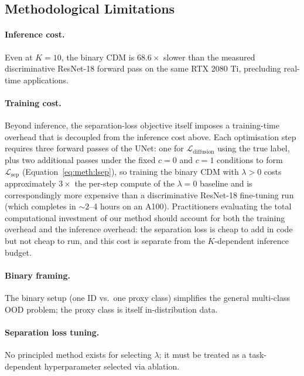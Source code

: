\subsection{Methodological Limitations}
\label{sec:disc:limitations:methodological}

\paragraph{Inference cost.}
Even at $K{=}10$, the binary CDM is $68.6{\times}$ slower than the
measured discriminative ResNet-18 forward pass on the same RTX 2080 Ti,
precluding real-time applications.

\paragraph{Training cost.}
Beyond inference, the separation-loss objective itself imposes a
training-time overhead that is decoupled from the inference cost above.
Each optimisation step requires three forward passes of the UNet: one
for $\mathcal{L}_{\text{diffusion}}$ using the true label, plus two
additional passes under the fixed $c{=}0$ and $c{=}1$ conditions to form
$\mathcal{L}_{\text{sep}}$
(Equation~\ref{eq:meth:lsep}), so
training the binary CDM with $\lambda > 0$ costs approximately
$3{\times}$ the per-step compute of the $\lambda = 0$ baseline and is
correspondingly more expensive than a discriminative ResNet-18
fine-tuning run (which completes in ${\sim}2$--4 hours on an A100).
Practitioners evaluating the total computational investment of our method
should account for both the training overhead and the inference overhead:
the separation loss is cheap to add in code but not cheap to run, and
this cost is separate from the $K$-dependent inference budget.

\paragraph{Binary framing.}
The binary setup (one ID vs.\ one proxy class) simplifies the general
multi-class OOD problem; the proxy class is itself in-distribution data.

\paragraph{Separation loss tuning.}
No principled method exists for selecting $\lambda$; it must be treated
as a task-dependent hyperparameter selected via ablation.

